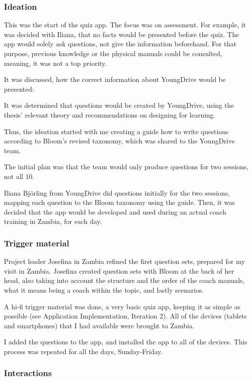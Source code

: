 \subsubsection*{Ideation}

This was the start of the quiz app. The focus was on assessment. For example, it was decided with Iliana, that no facts would be presented before the quiz. The app would solely ask questions, not give the information beforehand. For that purpose, previous knowledge or the physical manuals could be consulted, meaning, it was not a top priority.

It was discussed, how the correct information about YoungDrive would be presented:

It was determined that questions would be created by YoungDrive, using the thesis' relevant theory and recommendations on designing for learning.

Thus, the ideation started with me creating a guide how to write questions according to Bloom's revised taxonomy, which was shared to the YoungDrive team.

The initial plan was that the team would only produce questions for two sessions, not all 10.

Iliana Björling from YoungDrive did questions initially for the two sessions, mapping each question to the Bloom taxonomy using the guide. Then, it was decided that the app would be developed and used during an actual coach training in Zambia, for each day.

\subsubsection*{Trigger material}
Project leader Josefina in Zambia refined the first question sets, prepared for my visit in Zambia. Josefina created question sets with Bloom at the back of her head, also taking into account the structure and the order of the coach manuals, what it means being a coach within the topic, and lastly scenarios.

A hi-fi trigger material was done, a very basic quiz app, keeping it as simple as possible (see Application Implementation, Iteration 2). All of the devices (tablets and smartphones) that I had available were brought to Zambia.

I added the questions to the app, and installed the app to all of the devices. This process was repeated for all the days, Sunday-Friday.

\subsubsection*{Interactions}

